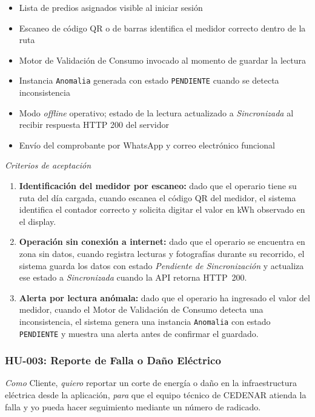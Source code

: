 \documentclass[12pt, a4paper]{article}
\begin{document}
\begin{itemize}
  \item Lista de predios asignados visible al iniciar sesión
  \item Escaneo de código QR o de barras identifica el medidor correcto dentro de la ruta
  \item Motor de Validación de Consumo invocado al momento de guardar la lectura
  \item Instancia \texttt{Anomalia} generada con estado \texttt{PENDIENTE} cuando se detecta inconsistencia
  \item Modo \textit{offline} operativo; estado de la lectura actualizado a \textit{Sincronizada} al recibir respuesta HTTP 200 del servidor
  \item Envío del comprobante por WhatsApp y correo electrónico funcional
\end{itemize}

\vspace{6pt}
\noindent\textit{Criterios de aceptación}

\begin{enumerate}
  \item \textbf{Identificación del medidor por escaneo:} dado que el operario tiene su ruta del día cargada, cuando escanea el código QR del medidor, el sistema identifica el contador correcto y solicita digitar el valor en kWh observado en el display.
  \item \textbf{Operación sin conexión a internet:} dado que el operario se encuentra en zona sin datos, cuando registra lecturas y fotografías durante su recorrido, el sistema guarda los datos con estado \textit{Pendiente de Sincronización} y actualiza ese estado a \textit{Sincronizada} cuando la API retorna HTTP~200.
  \item \textbf{Alerta por lectura anómala:} dado que el operario ha ingresado el valor del medidor, cuando el Motor de Validación de Consumo detecta una inconsistencia, el sistema genera una instancia \texttt{Anomalia} con estado \texttt{PENDIENTE} y muestra una alerta antes de confirmar el guardado.
\end{enumerate}

\subsubsection{HU-003: Reporte de Falla o Daño Eléctrico}

\noindent\textit{Como} Cliente, \textit{quiero} reportar un corte de energía o daño en la infraestructura eléctrica desde la aplicación, \textit{para} que el equipo técnico de CEDENAR atienda la falla y yo pueda hacer seguimiento mediante un número de radicado.
\end{document}
